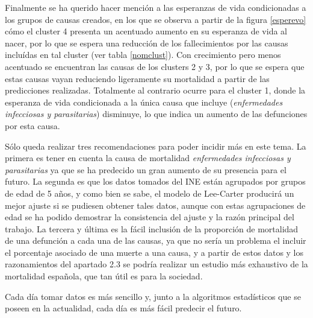 \documentclass{article}
\begin{document}
\vspace{0.3cm}

Finalmente se ha querido hacer mención a las esperanzas de vida condicionadas a los grupos de causas creados, en los que se observa a partir de la figura \ref{esperevo} cómo el cluster 4 presenta un acentuado aumento en su esperanza de vida al nacer, por lo que se espera una reducción de los fallecimientos por las causas incluídas en tal cluster (ver tabla \ref{nomclust}). Con crecimiento pero menos acentuado se encuentran las causas de los clusters 2 y 3, por lo que se espera que estas causas vayan reduciendo ligeramente su mortalidad a partir de las predicciones realizadas. Totalmente al contrario ocurre para el cluster 1, donde la esperanza de vida condicionada a la única causa que incluye (\emph{enfermedades infecciosas y parasitarias}) disminuye, lo que indica un aumento de las defunciones por esta causa.

\vspace{0.3cm}

Sólo queda realizar tres recomendaciones para poder incidir más en este tema. La primera es tener en cuenta la causa de mortalidad \emph{enfermedades infecciosas y parasitarias} ya que se ha predecido un gran aumento de su presencia para el futuro. La segunda es que los datos tomados del INE están agrupados por grupos de edad de 5 años, y como bien se sabe, el modelo de Lee-Carter producirá un mejor ajuste si se pudiesen obtener tales datos, aunque con estas agrupaciones de edad se ha podido demostrar la consistencia del ajuste y la razón principal del trabajo. La tercera y última es la fácil inclusión de la proporción de mortalidad de una defunción a cada una de las causas, ya que no sería un problema el incluir el porcentaje asociado de una muerte a una causa, y a partir de estos datos y los razonamientos del apartado 2.3 se podría realizar un estudio más exhaustivo de la mortalidad española, que tan útil es para la sociedad.



\vspace{0.3cm}

Cada día tomar datos es más sencillo y, junto a la algoritmos estadísticos que se poseen en la actualidad, cada día es más fácil predecir el futuro.

\newpage


\newpage


\nocite{*}
\end{document}
